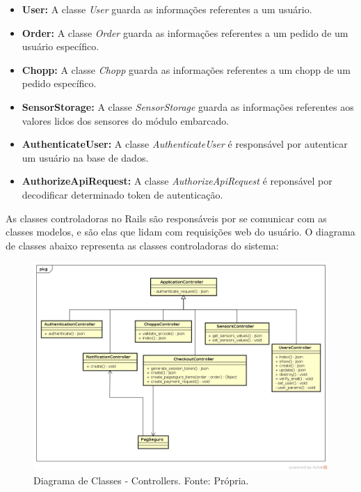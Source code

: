 \begin{itemize}
    \item \textbf{User:} A classe \textit{User} guarda as informações referentes a um usuário.
    \item \textbf{Order:} A classe \textit{Order} guarda as informações referentes a um pedido
     de um usuário específico. 
    \item \textbf{Chopp:} A classe \textit{Chopp} guarda as informações referentes a um chopp
    de um pedido específico.
    \item \textbf{SensorStorage:} A classe \textit{SensorStorage} guarda as informações referentes
    aos valores lidos dos sensores do módulo embarcado.
    \item \textbf{AuthenticateUser:} A classe \textit{AuthenticateUser} é responsável por autenticar um usuário
    na base de dados.
    \item \textbf{AuthorizeApiRequest:} A classe \textit{AuthorizeApiRequest} é reponsável por 
    decodificar determinado token de autenticação.
\end{itemize}


As classes controladoras no Rails são responsáveis por se comunicar com as classes modelos, e são elas que lidam com
requisições web do usuário. O diagrama de classes abaixo representa as classes controladoras do sistema:

\begin{figure}[H]
    \centering
    \includegraphics[scale= 0.5]{figuras/diagrama-controllers.png}
    \caption{Diagrama de Classes - Controllers. Fonte: Própria.}
    \label{modelagem}
\end{figure}

